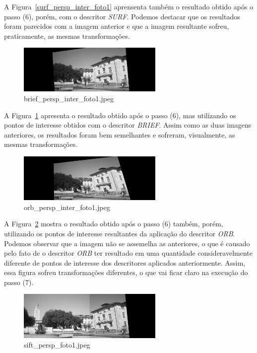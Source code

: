 \documentclass[twoside,twocolumn]{article}
\begin{document}
A Figura~\ref{surf_persp_inter_foto1} aprensenta também o resultado obtido após o passo (6), porém, com o descritor \textit{SURF}. Podemos destacar que os resultados foram parecidos com a imagem anterior e que a imagem resultante sofreu, praticamente, as mesmas transformações.

\begin{figure}[H]
\begin{center}
	\includegraphics[width=7cm]{figures/brief_persp_inter_foto1.jpeg}
\caption{brief\_persp\_inter\_foto1.jpeg} \label{brief_persp_inter_foto1}
\end{center}
\end{figure}

A Figura~\ref{brief_persp_inter_foto1} apresenta o resultado obtido após o passo (6), mas utilizando os pontos de interesse obtidos com o descritor \textit{BRIEF}. Assim como as duas imagens anteriores, os resultados foram bem semelhantes e sofreram, visualmente, as mesmas transformações.

\begin{figure}[H]
\begin{center}
	\includegraphics[width=7cm]{figures/orb_persp_inter_foto1.jpeg}
\caption{orb\_persp\_inter\_foto1.jpeg} \label{orb_persp_inter_foto1}
\end{center}
\end{figure}

A Figura~\ref{orb_persp_inter_foto1} mostra o resultado obtido após o passo (6) também, porém, utilizando os pontos de interesse resultantes da aplicação do descritor \textit{ORB}. Podemos observar que a imagem não se assemelha as anteriores, o que é causado pelo fato de o descritor \textit{ORB} ter resultado em uma quantidade consideravelmente diferente de pontos de interesse dos descritores aplicados anteriormente. Assim, essa figura sofreu transformações diferentes, o que vai ficar claro na execução do passo (7).

\begin{figure}[H]
\begin{center}
	\includegraphics[width=7cm]{figures/sift_persp_foto1.jpeg}
\caption{sift\_persp\_foto1.jpeg} \label{sift_persp_foto1}
\end{center}
\end{figure}
\end{document}
